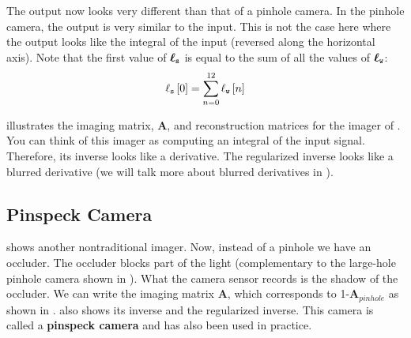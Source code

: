 The output now looks very different than that of a pinhole camera. In the pinhole camera, the output is very similar to the input. This is not the case here where the output looks like the integral of the input (reversed along the horizontal axis). Note that the first value of $\boldsymbol\ell_{\texttt{s}}$ is equal to the sum of all the values of $\boldsymbol\ell_{\texttt{w}}$:
\begin{equation}
\ell_{\texttt{s}} \left[0 \right] = \sum_{n=0}^{12} \ell_{\texttt{w}} \left[n \right]
\end{equation}

 illustrates the imaging matrix, $\mathbf{A}$, and reconstruction matrices for the imager of \eqn{\ref{eq:edge}}. You can think of this imager as computing an integral of the input signal. Therefore, its inverse looks like a derivative. The regularized inverse looks like a blurred derivative (we will talk more about blurred derivatives in \chap{\ref{chapter:image_derivatives}}).


\subsection{Pinspeck Camera}

 shows another nontraditional imager. Now, instead of a pinhole we have an occluder. The occluder blocks part of the light (complementary to the large-hole pinhole camera shown in ). What the camera sensor records is the shadow of the occluder.
We can write the imaging matrix $\mathbf{A}$, which corresponds to 1-$\mathbf{A}_{pinhole}$ as shown in .  also shows its inverse and the regularized inverse. This camera is called a {\bf pinspeck camera} \cite{CohenPinspeck,Torralba2014} and has also been used in practice. 

